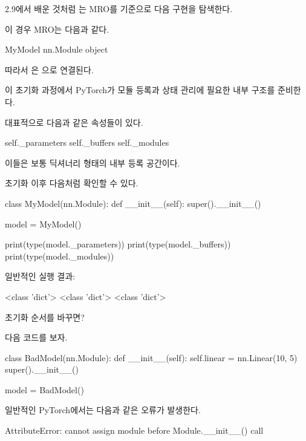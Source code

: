 2.9에서 배운 것처럼 는 MRO를 기준으로 다음 구현을 탐색한다.

이 경우 MRO는 다음과 같다.

\begin{dhksmry}[centered]
MyModel \ra nn.Module \ra object
\end{dhksmry}

따라서 은 으로 연결된다.

이 초기화 과정에서 PyTorch가 모듈 등록과 상태 관리에 필요한 내부 구조를 준비한다.

대표적으로 다음과 같은 속성들이 있다.

\begin{dhkcode}
self._parameters
self._buffers
self._modules
\end{dhkcode}

이들은 보통 딕셔너리 형태의 내부 등록 공간이다.

초기화 이후 다음처럼 확인할 수 있다.

\begin{dhkcode}
class MyModel(nn.Module):
    def __init__(self):
        super().__init__()


model = MyModel()

print(type(model._parameters))
print(type(model._buffers))
print(type(model._modules))
\end{dhkcode}

일반적인 실행 결과:

\begin{dhkzsh}
<class 'dict'>
<class 'dict'>
<class 'dict'>
\end{dhkzsh}

\begin{dhknote}
\begin{dhksmry}[centered]
초기화 순서를 바꾸면?
\end{dhksmry}
\end{dhknote}

다음 코드를 보자.

\begin{dhkcode}
class BadModel(nn.Module):
    def __init__(self):
        self.linear = nn.Linear(10, 5)
        super().__init__()

model = BadModel()
\end{dhkcode}

일반적인 PyTorch에서는 다음과 같은 오류가 발생한다.

\begin{dhkzsh}
AttributeError: cannot assign module before Module.__init__() call
\end{dhkzsh}


